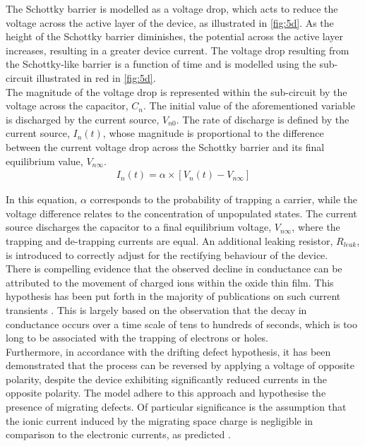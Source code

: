 \noindent The Schottky barrier is modelled as a voltage drop, which acts to reduce the voltage across the active layer of the device, as illustrated in \ref{fig:5d}. As the height of the Schottky barrier diminishes, the potential across the active layer increases, resulting in a greater device current. The voltage drop resulting from the Schottky-like barrier is a function of time and is modelled using the sub-circuit illustrated in red in \ref{fig:5d}. \\

\noindent The magnitude of the voltage drop is represented within the sub-circuit by the voltage across the capacitor, $C_n$. The initial value of the aforementioned variable is discharged by the current source, $V_{n0}$. The rate of discharge is defined by the current source, $I_n(t)$, whose magnitude is proportional to the difference between the current voltage drop across the Schottky barrier and its final equilibrium value, $V_{n\infty}$.
\begin{align}
I_n(t) = \alpha \times \left[ V_n(t) - V_{n\infty} \right] \label{eq:5.5} 
\end{align}

\noindent In this equation, $\alpha$ corresponds to the probability of trapping a carrier, while the voltage difference relates to the concentration of unpopulated states. The current source discharges the capacitor to a final equilibrium voltage, $V_{n\infty}$, where the trapping and de-trapping currents are equal. An additional leaking resistor, $R_{leak}$, is introduced to correctly adjust for the rectifying behaviour of the device.\\

\noindent There is compelling evidence that the observed decline in conductance can be attributed to the movement of charged ions within the oxide thin film. This hypothesis has been put forth in the majority of publications on such current transients \cite{wang2006oxygen}. This is largely based on the observation that the decay in conductance occurs over a time scale of tens to hundreds of seconds, which is too long to be associated with the trapping of electrons or holes. \\

\noindent Furthermore, in accordance with the drifting defect hypothesis, it has been demonstrated that the process can be reversed by applying a voltage of opposite polarity, despite the device exhibiting significantly reduced currents in the opposite polarity. The model adhere to this approach and hypothesise the presence of migrating defects. Of particular significance is the assumption that the ionic current induced by the migrating space charge is negligible in comparison to the electronic currents, as predicted \cite{meyer2005oxygen}. \\

